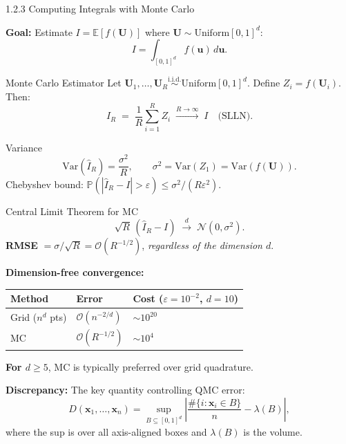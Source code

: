 \documentclass[aspectratio=169,10pt]{beamer}
\begin{document}
\begin{frame}[allowframebreaks]{1.2.3 Computing Integrals with Monte Carlo}

  \textbf{Goal:} Estimate $I = \mathbb{E}[f(\mathbf{U})]$ where
  $\mathbf{U} \sim \mathrm{Uniform}[0,1]^d$:
  \[
    I = \int_{[0,1]^d} f(\mathbf{u})\,d\mathbf{u}.
  \]

  \begin{block}{Monte Carlo Estimator}
    Let $\mathbf{U}_1, \ldots, \mathbf{U}_R \overset{\mathrm{i.i.d.}}{\sim}
    \mathrm{Uniform}[0,1]^d$. Define $Z_i = f(\mathbf{U}_i)$. Then:
    \[
      \hat{I}_R \;=\; \frac{1}{R}\sum_{i=1}^{R} Z_i
      \;\xrightarrow{R\to\infty}\; I
      \quad\text{(SLLN)}.
    \]
  \end{block}

  \begin{block}{Variance}
    \[
      \mathrm{Var}(\hat{I}_R) = \frac{\sigma^2}{R}, \qquad
      \sigma^2 = \mathrm{Var}(Z_1) = \mathrm{Var}(f(\mathbf{U})).
    \]
    Chebyshev bound:
    $\mathbb{P}(|\hat{I}_R - I| > \varepsilon) \le \sigma^2 / (R\varepsilon^2)$.
  \end{block}

  \framebreak

  \begin{block}{Central Limit Theorem for MC}
    \[
      \sqrt{R}\,(\hat{I}_R - I)
      \;\xrightarrow{d}\; \mathcal{N}(0,\sigma^2).
    \]
    \textbf{RMSE} $= \sigma/\sqrt{R} = \mathcal{O}(R^{-1/2})$,
    \emph{regardless of the dimension $d$}.
  \end{block}

  \textbf{Dimension-free convergence:}
  \begin{center}
  \begin{tabular}{lll}
    \toprule
    Method & Error & Cost ($\varepsilon=10^{-2}$, $d=10$) \\
    \midrule
    Grid ($n^d$ pts) & $\mathcal{O}(n^{-2/d})$ & $\sim 10^{20}$ \\
    MC               & $\mathcal{O}(R^{-1/2})$ & $\sim 10^{4}$ \\
    \bottomrule
  \end{tabular}
  \end{center}

  \textbf{For $d \ge 5$}, MC is typically preferred over grid quadrature.

  \framebreak

  \textbf{Discrepancy:} The key quantity controlling QMC error:
  \[
    D(\mathbf{x}_1, \ldots, \mathbf{x}_n)
    = \sup_{B \subseteq [0,1]^d}
      \left|\frac{\#\{i : \mathbf{x}_i \in B\}}{n} - \lambda(B)\right|,
  \]
  where the sup is over all axis-aligned boxes and $\lambda(B)$ is the volume.


\end{frame}
\end{document}
